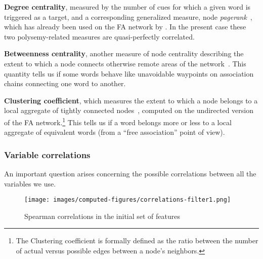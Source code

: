 \begin{APAitemize}
    \item \textbf{Degree centrality}, measured by the number of cues for which a given word is triggered as a target, and a corresponding generalized measure, node \emph{pagerank}~\citep{Page99}, which has already been used on the FA network by \citet{Griffiths07}.
    In the present case these two polysemy-related measures are quasi-perfectly correlated. %
    \item \textbf{Betweenness centrality}, another measure of node centrality describing the extent to which a node connects otherwise remote areas of the network~\citep{free:set}.
    This quantity tells us if some words behave like unavoidable waypoints on association chains connecting one word to another.
    \item \textbf{Clustering coefficient}, which measures the extent to which a node belongs to a local aggregate of tightly connected nodes~\citep{watt-coll}, computed on the undirected version of the FA network.\footnote{The Clustering coefficient is formally defined as the ratio between the number of actual versus possible edges between a node's neighbors.}
    This tells us if a word belongs more or less to a local aggregate of equivalent words (from a ``free association'' point of view).
\end{APAitemize}

\subsubsection{Variable correlations}

An important question arises concerning the possible correlations between all the variables we use.

\begin{figure}[!th]
    \centering
    \texttt{[image: images/computed-figures/correlations-filter1.png]}
    \caption{Spearman correlations in the initial set of features}
    \label{fig:feature-corrs-initial}
\end{figure}

